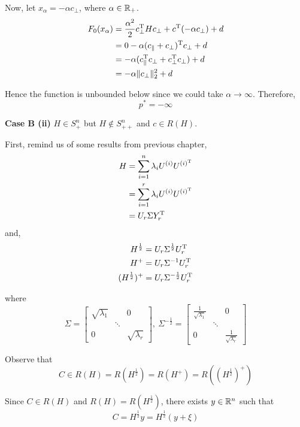 Now, let $x_{\alpha} =-\alpha c_{\perp}$, where $\alpha \in \mathbb{R}_+$.
\begin{align*}
F_0(x_{\alpha}) 
&=\frac{{\alpha}^2}{2}c_{\perp}^{{\rm T}}Hc_{\perp} + c^{{\rm T}}(-\alpha c_{\perp}) + d\\
&= 0 - \alpha(c_{\Vert} + c_{\perp})^{{\rm T}}c_{\perp} + d\\
&= -\alpha(c_{\Vert}^{{\rm T}}c_{\perp} + c_{\perp}^{{\rm T}}c_{\perp}) + d\\
&= -\alpha \Vert c_{\perp}\Vert^2_2 + d
\end{align*}

Hence the function is unbounded below since we could take $\alpha \to\infty$. Therefore,
$$p^*=-\infty$$



\vspace{0.3cm}
\textbf{Case B (ii)}  $H\in S_+^n$ but $H\notin S^n_{++}$ and $c \in R(H)$.

First, remind us of some results from previous chapter,
\begin{align*}
H 
&= \sum^n_{i=1}\lambda_i U^{(i)}U^{(i)^{{\rm T}}} \\
&= \sum^r_{i=1}\lambda_i U^{(i)}U^{(i)^{{\rm T}}}\\
&= U_r\Sigma Y_r^{{\rm T}}
\end{align*}
and,
\begin{align*}
H^{\frac{1}{2}} &= U_r\Sigma^{\frac{1}{2}}U_r^{{\rm T}}\\
H^{+} &= U_r\Sigma^{-1}U_r^{{\rm T}}\\
(H^{\frac{1}{2}})^+ &= U_r\Sigma^{-\frac{1}{2}}U_r^{{\rm T}}
\end{align*}

where 
$$\Sigma = 
\begin{bmatrix}
\sqrt{\lambda_1} &  & 0 \\
&\ddots&\\
0&&\sqrt{\lambda_r}
\end{bmatrix}
,\
\Sigma^{-\frac{1}{2}} =
\begin{bmatrix}
\frac{1}{\sqrt{\lambda_1}} &  & 0 \\
&\ddots&\\
0&&\frac{1}{\sqrt{\lambda_r}}
\end{bmatrix}
$$

Observe that
$$C\in R(H) = R(H^{\frac{1}{2}}) = R(H^+) = R\left((H^{\frac{1}{2}})^+\right)$$

Since $C\in R(H)$ and $R(H) = R(H^{\frac{1}{2}})$, there exists $y \in \mathbb{R}^n$ such that
$$C = H^{\frac{1}{2}}y = H^{\frac{1}{2}}(y+\xi)$$

